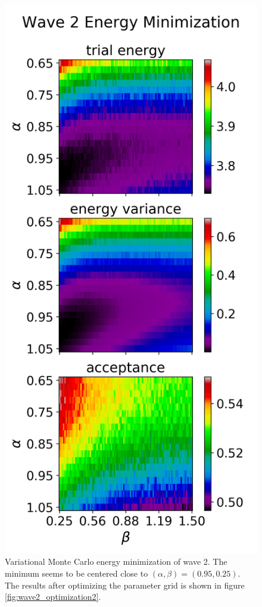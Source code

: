 \documentclass[nofootinbib,reprint,english]{revtex4-1}
\begin{document}
\begin{figure}[h!]
\centering
\includegraphics[scale=0.7]{../results/wave2/energy_minimization_1.png}
\caption{Variational Monte Carlo energy minimization of wave 2. The minimum seems to be centered close to \((\alpha,\beta)=(0.95,0.25)\). The results after optimizing the parameter grid is shown in figure \ref{fig:wave2_optimization2}.}\label{fig:wave2_optimization1}
\end{figure}
\end{document}
